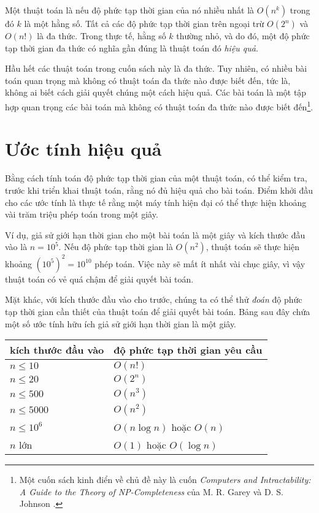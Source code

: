 Một thuật toán là 
nếu độ phức tạp thời gian của nó nhiều nhất là $O(n^k)$
trong đó $k$ là một hằng số.
Tất cả các độ phức tạp thời gian trên ngoại trừ
$O(2^n)$ và $O(n!)$ là đa thức.
Trong thực tế, hằng số $k$ thường nhỏ,
và do đó, một độ phức tạp thời gian đa thức
có nghĩa gần đúng là thuật toán đó \emph{hiệu quả}.


Hầu hết các thuật toán trong cuốn sách này là đa thức.
Tuy nhiên, có nhiều bài toán quan trọng mà
không có thuật toán đa thức nào được biết đến, tức là,
không ai biết cách giải quyết chúng một cách hiệu quả.
Các bài toán  là một tập hợp quan trọng
các bài toán mà không có thuật toán đa thức nào
được biết đến\footnote{Một cuốn sách kinh điển về chủ đề này là
cuốn \emph{Computers and Intractability: A Guide to the Theory
of NP-Completeness} của M. R. Garey và D. S. Johnson \cite{gar79}.}.

\section{Ước tính hiệu quả}

Bằng cách tính toán độ phức tạp thời gian của một thuật toán,
có thể kiểm tra, trước khi
triển khai thuật toán, rằng nó
đủ hiệu quả cho bài toán.
Điểm khởi đầu cho các ước tính là thực tế rằng
một máy tính hiện đại có thể thực hiện khoảng vài trăm
triệu phép toán trong một giây.

Ví dụ, giả sử giới hạn thời gian cho
một bài toán là một giây và kích thước đầu vào là $n=10^5$.
Nếu độ phức tạp thời gian là $O(n^2)$,
thuật toán sẽ thực hiện khoảng $(10^5)^2=10^{10}$ phép toán.
Việc này sẽ mất ít nhất vài chục giây,
vì vậy thuật toán có vẻ quá chậm để giải quyết bài toán.

Mặt khác, với kích thước đầu vào cho trước,
chúng ta có thể thử \emph{đoán}
độ phức tạp thời gian cần thiết của thuật toán
để giải quyết bài toán.
Bảng sau đây chứa một số ước tính hữu ích
giả sử giới hạn thời gian là một giây.

\begin{center}
\begin{tabular}{ll}
kích thước đầu vào & độ phức tạp thời gian yêu cầu \\
\hline
$n \le 10$ & $O(n!)$ \\
$n \le 20$ & $O(2^n)$ \\
$n \le 500$ & $O(n^3)$ \\
$n \le 5000$ & $O(n^2)$ \\
$n \le 10^6$ & $O(n \log n)$ hoặc $O(n)$ \\
$n$ lớn & $O(1)$ hoặc $O(\log n)$ \\
\end{tabular}
\end{center}

